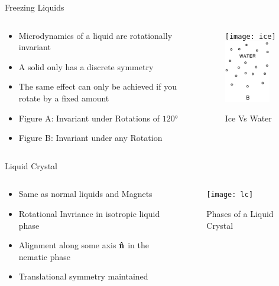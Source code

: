 \documentclass{beamer}
\begin{document}
\begin{frame}{Freezing Liquids}
  \begin{columns}
    \begin{column}{0.5\textwidth}
      \begin{itemize}
      \item Microdynamics of a liquid are rotationally invariant
      \item A solid only has a discrete symmetry
      \item The same effect can only be achieved if you rotate by a fixed amount
      \item Figure A: Invariant under Rotations of $\ang{120}$
      \item Figure B: Invariant under any Rotation
      \end{itemize}
    \end{column}
    \begin{column}{0.5\textwidth}
      \begin{figure}[H]
        \centering
        \texttt{[image: ice]}
        \includegraphics[width=2.0cm]{water}
        \caption{Ice Vs Water}
      \end{figure}
    \end{column}
  \end{columns}
\end{frame}

\begin{frame}{Liquid Crystal}
  \begin{columns}
    \begin{column}{0.5\textwidth}
      \begin{itemize}
      \item Same as normal liquids and Magnets
      \item Rotational Invriance in isotropic liquid phase
      \item Alignment along some axis $\vu{n}$ in the nematic phase
      \item Translational symmetry maintained
      \end{itemize}
    \end{column}
    \begin{column}{0.5\textwidth}
      \begin{figure}[H]
        \centering
        \texttt{[image: lc]}
        \caption{Phases of a Liquid Crystal}
      \end{figure}
    \end{column}
  \end{columns}
\end{frame}
\end{document}

